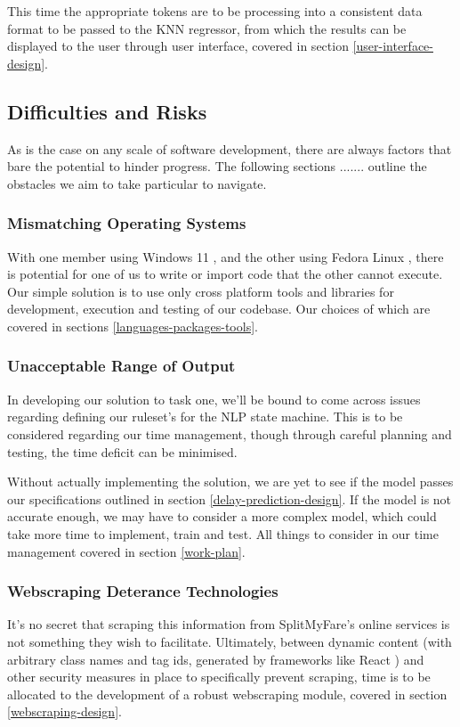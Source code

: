 \documentclass[11pt]{article}
\newcounter{subsubsubsection}[subsubsection]
\begin{document}
This time the appropriate tokens are to be processing into a consistent data format to be passed to the KNN regressor, from which the results can be displayed to the user through user interface, covered in section \ref{user-interface-design}.


\subsection{Difficulties and Risks} \label{difficulties-risks}

As is the case on any scale of software development, there are always factors that bare the potential to hinder progress. The following sections ....... outline the obstacles we aim to take particular to navigate.

\subsubsection{Mismatching Operating Systems} \label{mismatching-os}

With one member using Windows 11 \cite{windows}, and the other using Fedora Linux \cite{fedora}, there is potential for one of us to write or import code that the other cannot execute. Our simple solution is to use only cross platform tools and libraries for development, execution and testing of our codebase. Our choices of which are covered in sections \ref{languages-packages-tools}.

\subsubsection{Unacceptable Range of Output} \label{unacceptable-output}

In developing our solution to task one, we'll be bound to come across issues regarding defining our ruleset's for the NLP state machine. This is to be considered regarding our time management, though through careful planning and testing, the time deficit can be minimised.

Without actually implementing the solution, we are yet to see if the model passes our specifications outlined in section \ref{delay-prediction-design}. If the model is not accurate enough, we may have to consider a more complex model, which could take more time to implement, train and test. All things to consider in our time management covered in section \ref{work-plan}.

\subsubsection{Webscraping Deterance Technologies} \label{webscrape-deterance}
It's no secret that scraping this information from SplitMyFare's online services is not something they wish to facilitate. Ultimately, between dynamic content (with arbitrary class names and tag ids, generated by frameworks like React \cite{react}) and other security measures in place to specifically prevent scraping, time is to be allocated to the development of a robust webscraping module, covered in section \ref{webscraping-design}.
\end{document}
